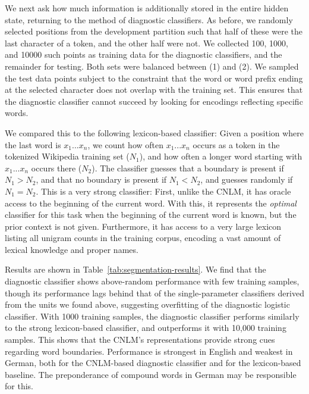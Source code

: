 We next ask how much information is additionally stored in the entire hidden state, returning to the method of diagnostic classifiers.
As before, we randomly selected positions from the development partition such that half of these were the last character of a token, and the other half were not.
We collected 100, 1000, and 10000 such points as training data for the diagnostic classifiers, and the remainder for testing.
Both sets were balanced between (1) and (2).
We sampled the test data points subject to the constraint that the word or word prefix ending at the selected character does not overlap with the training set.
This ensures that the diagnostic classifier cannot succeed by looking for encodings reflecting specific words.



We compared this to the following lexicon-based classifier:
Given a position where the last word is $x_1...x_n$, we count how often $x_1...x_n$ occurs as a token in the tokenized Wikipedia training set ($N_1$), and how often a longer word starting with $x_1...x_n$ occurs there ($N_2$).
The classifier guesses that a boundary is present if $N_1 > N_2$, and that no boundary is present if $N_1 < N_2$, and guesses randomly if $N_1 = N_2$.
This is a very strong classifier:
First, unlike the CNLM, it has oracle access to the beginning of the current word.
With this, it represents the \emph{optimal} classifier for this task when the beginning of the current word is known, but the prior context is not given.
Furthermore, it has access to a very large lexicon listing all unigram counts in the training corpus, encoding a vast amount of lexical knowledge and proper names.

Results are shown in Table~\ref{tab:segmentation-results}.
We find that the diagnostic classifier shows above-random performance with few training samples, though its performance lags behind that of the single-parameter classifiers derived from the units we found above, suggesting overfitting of the diagnostic logistic classifier.
With 1000 training samples, the diagnostic classifier performs similarly to the strong lexicon-based classifier, and outperforms it with 10,000 training samples.
This shows that the CNLM's representations provide strong cues regarding word boundaries.
Performance is strongest in English and weakest in German, both for the CNLM-based diagnostic classifier and for the lexicon-based baseline.
The preponderance of compound words in German may be responsible for this.

